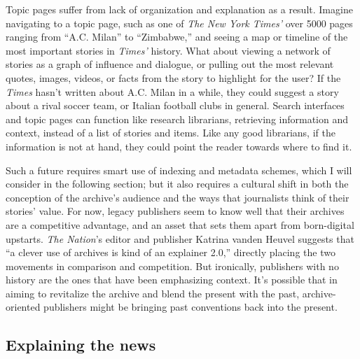 Topic pages suffer from lack of organization and explanation as a result. Imagine navigating to a topic page, such as one of \emph{The New York Times'} over 5000 pages ranging from ``A.C. Milan'' to ``Zimbabwe,'' and seeing a map or timeline of the most important stories in \emph{Times'} history. What about viewing a network of stories as a graph of influence and dialogue, or pulling out the most relevant quotes, images, videos, or facts from the story to highlight for the user? If the \emph{Times} hasn't written about A.C. Milan in a while, they could suggest a story about a rival soccer team, or Italian football clubs in general. Search interfaces and topic pages can function like research librarians, retrieving information and context, instead of a list of stories and items. Like any good librarians, if the information is not at hand, they could point the reader towards where to find it.

Such a future requires smart use of indexing and metadata schemes, which I will consider in the following section; but it also requires a cultural shift in both the conception of the archive's audience and the ways that journalists think of their stories' value. For now, legacy publishers seem to know well that their archives are a competitive advantage, and an asset that sets them apart from born-digital upstarts. \emph{The Nation}'s editor and publisher Katrina vanden Heuvel suggests that ``a clever use of archives is kind of an explainer 2.0,'' directly placing the two movements in comparison and competition.\autocite{levy_time.com_2014} But ironically, publishers with no history are the ones that have been emphasizing context. It's possible that in aiming to revitalize the archive and blend the present with the past, archive-oriented publishers might be bringing past conventions back into the present.

\subsection{Explaining the news}


